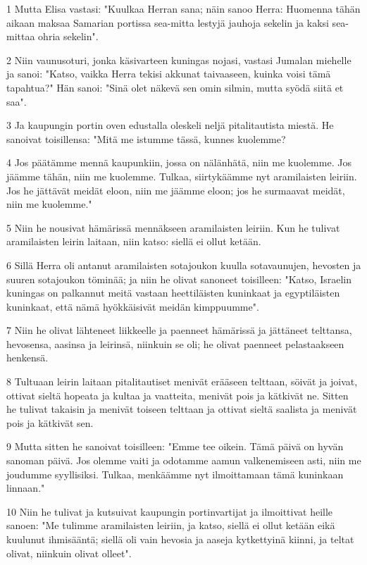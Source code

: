 \par 1 Mutta Elisa vastasi: "Kuulkaa Herran sana; näin sanoo Herra: Huomenna tähän aikaan maksaa Samarian portissa sea-mitta lestyjä jauhoja sekelin ja kaksi sea-mittaa ohria sekelin".
\par 2 Niin vaunusoturi, jonka käsivarteen kuningas nojasi, vastasi Jumalan miehelle ja sanoi: "Katso, vaikka Herra tekisi akkunat taivaaseen, kuinka voisi tämä tapahtua?" Hän sanoi: "Sinä olet näkevä sen omin silmin, mutta syödä siitä et saa".
\par 3 Ja kaupungin portin oven edustalla oleskeli neljä pitalitautista miestä. He sanoivat toisillensa: "Mitä me istumme tässä, kunnes kuolemme?
\par 4 Jos päätämme mennä kaupunkiin, jossa on nälänhätä, niin me kuolemme. Jos jäämme tähän, niin me kuolemme. Tulkaa, siirtykäämme nyt aramilaisten leiriin. Jos he jättävät meidät eloon, niin me jäämme eloon; jos he surmaavat meidät, niin me kuolemme."
\par 5 Niin he nousivat hämärissä mennäkseen aramilaisten leiriin. Kun he tulivat aramilaisten leirin laitaan, niin katso: siellä ei ollut ketään.
\par 6 Sillä Herra oli antanut aramilaisten sotajoukon kuulla sotavaunujen, hevosten ja suuren sotajoukon töminää; ja niin he olivat sanoneet toisilleen: "Katso, Israelin kuningas on palkannut meitä vastaan heettiläisten kuninkaat ja egyptiläisten kuninkaat, että nämä hyökkäisivät meidän kimppuumme".
\par 7 Niin he olivat lähteneet liikkeelle ja paenneet hämärissä ja jättäneet telttansa, hevosensa, aasinsa ja leirinsä, niinkuin se oli; he olivat paenneet pelastaakseen henkensä.
\par 8 Tultuaan leirin laitaan pitalitautiset menivät erääseen telttaan, söivät ja joivat, ottivat sieltä hopeata ja kultaa ja vaatteita, menivät pois ja kätkivät ne. Sitten he tulivat takaisin ja menivät toiseen telttaan ja ottivat sieltä saalista ja menivät pois ja kätkivät sen.
\par 9 Mutta sitten he sanoivat toisilleen: "Emme tee oikein. Tämä päivä on hyvän sanoman päivä. Jos olemme vaiti ja odotamme aamun valkenemiseen asti, niin me joudumme syyllisiksi. Tulkaa, menkäämme nyt ilmoittamaan tämä kuninkaan linnaan."
\par 10 Niin he tulivat ja kutsuivat kaupungin portinvartijat ja ilmoittivat heille sanoen: "Me tulimme aramilaisten leiriin, ja katso, siellä ei ollut ketään eikä kuulunut ihmisääntä; siellä oli vain hevosia ja aaseja kytkettyinä kiinni, ja teltat olivat, niinkuin olivat olleet".
